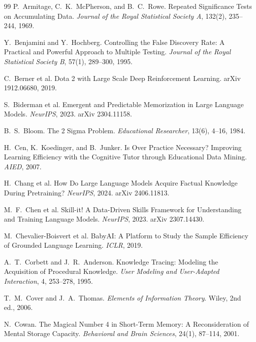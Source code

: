 \documentclass[11pt]{article}
\theoremstyle{plain}
\theoremstyle{definition}
\theoremstyle{remark}
\begin{document}
\begin{thebibliography}{99}
 P.~Armitage, C.~K.~McPherson, and B.~C.~Rowe.
Repeated Significance Tests on Accumulating Data. \emph{Journal of the Royal Statistical Society A},
132(2), 235--244, 1969.

 Y.~Benjamini and Y.~Hochberg.
Controlling the False Discovery Rate: A Practical and Powerful Approach to Multiple Testing.
\emph{Journal of the Royal Statistical Society B}, 57(1), 289--300, 1995.

 C.~Berner et al. Dota 2 with Large Scale Deep
Reinforcement Learning. arXiv 1912.06680, 2019.

 S.~Biderman et al. Emergent and Predictable
Memorization in Large Language Models. \emph{NeurIPS}, 2023. arXiv 2304.11158.

 B.~S.~Bloom. The 2 Sigma Problem. \emph{Educational Researcher},
13(6), 4--16, 1984.

 H.~Cen, K.~Koedinger, and B.~Junker. Is Over
Practice Necessary? Improving Learning Efficiency with the Cognitive Tutor through Educational Data
Mining. \emph{AIED}, 2007.

 H.~Chang et al. How Do Large Language Models Acquire
Factual Knowledge During Pretraining? \emph{NeurIPS}, 2024. arXiv 2406.11813.

 M.~F.~Chen et al. Skill-it! A Data-Driven Skills
Framework for Understanding and Training Language Models. \emph{NeurIPS}, 2023. arXiv 2307.14430.

 M.~Chevalier-Boisvert et al.
BabyAI: A Platform to Study the Sample Efficiency of Grounded Language Learning. \emph{ICLR}, 2019.

 A.~T.~Corbett and J.~R.~Anderson.
Knowledge Tracing: Modeling the Acquisition of Procedural Knowledge. \emph{User Modeling and
User-Adapted Interaction}, 4, 253--278, 1995.

 T.~M.~Cover and J.~A.~Thomas. \emph{Elements of
Information Theory}. Wiley, 2nd ed., 2006.

 N.~Cowan. The Magical Number 4 in Short-Term Memory: A
Reconsideration of Mental Storage Capacity. \emph{Behavioral and Brain Sciences}, 24(1), 87--114,
2001.


\end{thebibliography}
\end{document}
